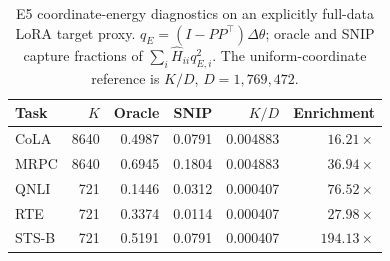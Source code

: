 \begin{table}[t]
\centering\small
\caption{E5 coordinate-energy diagnostics on an explicitly full-data LoRA target proxy. $q_E=(I-PP^\top)\Delta\theta$; oracle and SNIP capture fractions of $\sum_i\hat H_{ii}q_{E,i}^2$. The uniform-coordinate reference is $K/D$, $D=1{,}769{,}472$.}
\label{tab:e5_recoverability}
\begin{tabular}{lrrrrr}
\toprule
Task & $K$ & Oracle & SNIP & $K/D$ & Enrichment \\
\midrule
CoLA & 8640 & 0.4987 & 0.0791 & 0.004883 & $16.21\times$ \\
MRPC & 8640 & 0.6945 & 0.1804 & 0.004883 & $36.94\times$ \\
QNLI & 721 & 0.1446 & 0.0312 & 0.000407 & $76.52\times$ \\
RTE & 721 & 0.3374 & 0.0114 & 0.000407 & $27.98\times$ \\
STS-B & 721 & 0.5191 & 0.0791 & 0.000407 & $194.13\times$ \\
\bottomrule
\end{tabular}
\end{table}
